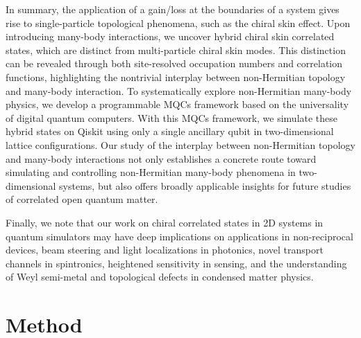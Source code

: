 \documentclass[longbibliography, aps, prx, amsmath, amssymb, amsfonts, twocolumn,superscriptaddress, footinbib]{revtex4-1}
\begin{document}
	In summary, the application of a gain/loss at the boundaries of a system gives rise to single-particle topological phenomena, such as the chiral skin effect. Upon introducing many-body interactions, we uncover hybrid chiral skin correlated states, which are distinct from multi-particle chiral skin modes. This distinction can be revealed through both site-resolved occupation numbers and correlation functions, highlighting the nontrivial interplay between non-Hermitian topology and many-body interaction. 
	To systematically explore non-Hermitian many-body physics, we develop a programmable MQCs framework based on the universality of digital quantum computers. 
	With this MQCs framework, we simulate these hybrid states on Qiskit using only a single ancillary qubit in two-dimensional lattice configurations. 
	Our study of the interplay between non-Hermitian topology and many-body interactions not only establishes a concrete route toward simulating and controlling non-Hermitian many-body phenomena in two-dimensional systems, but also offers broadly applicable insights for future studies of correlated open quantum matter.

    Finally, we note that our work on chiral correlated states in 2D systems in quantum simulators may have deep implications on applications in non-reciprocal devices, beam steering and light localizations in photonics, novel transport channels in spintronics, heightened sensitivity in sensing, and the understanding of Weyl semi-metal and topological defects in condensed matter physics.


	\section{Method}
\end{document}
